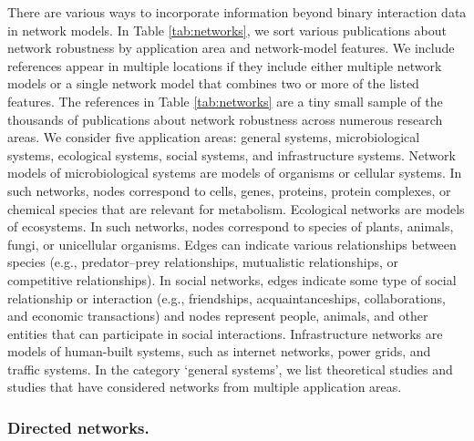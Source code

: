 \documentclass{comnet-mod}
\begin{document}
There are various ways to incorporate information beyond binary interaction data in network models.
In Table \ref{tab:networks}, we sort various publications about network robustness by application area and network-model features. We include references appear in multiple locations if they include either multiple network models or a single network model that combines two or more of the listed features. The references in Table \ref{tab:networks} are a tiny small sample of the thousands of publications about network robustness across numerous research areas. We consider five application areas: general systems, microbiological systems, ecological systems, social systems, and infrastructure systems. Network models of microbiological systems are models of organisms or cellular systems. In such networks, nodes correspond to cells, genes, proteins, protein complexes, or chemical species that are relevant for metabolism. Ecological networks are models of ecosystems. In such networks, nodes correspond to species of plants, animals, fungi, or unicellular organisms. Edges can indicate various relationships between species (e.g., predator--prey relationships, mutualistic relationships, or competitive relationships). In social networks, edges indicate some type of social relationship or interaction (e.g., friendships, acquaintanceships, collaborations, and economic transactions) and nodes represent people, animals, and other entities that can participate in social interactions. Infrastructure networks are models of human-built systems, such as internet networks, power grids, and traffic systems. In the category `general systems', we list theoretical studies and studies that have considered networks from multiple application areas.


\subsubsection{Directed networks.} 
\end{document}
